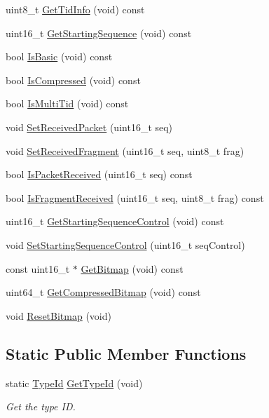 \begin{DoxyCompactItemize}
\item 
uint8\+\_\+t \hyperlink{classns3_1_1CtrlBAckResponseHeader_a43f367a0133f6741cf6649043cd70acb}{Get\+Tid\+Info} (void) const 
\item 
uint16\+\_\+t \hyperlink{classns3_1_1CtrlBAckResponseHeader_a23036dba9b580cbf431c3f3c472a3c2e}{Get\+Starting\+Sequence} (void) const 
\item 
bool \hyperlink{classns3_1_1CtrlBAckResponseHeader_aece37074c13f1dc4975cb2fbd5aa7d71}{Is\+Basic} (void) const 
\item 
bool \hyperlink{classns3_1_1CtrlBAckResponseHeader_a99150c95476eff0f8c51bee471f57c81}{Is\+Compressed} (void) const 
\item 
bool \hyperlink{classns3_1_1CtrlBAckResponseHeader_ad49134f2d4a9049c650951feed43d2e6}{Is\+Multi\+Tid} (void) const 
\item 
void \hyperlink{classns3_1_1CtrlBAckResponseHeader_af4aa188d4fe6bb69fe1e9ca24733e5a5}{Set\+Received\+Packet} (uint16\+\_\+t seq)
\item 
void \hyperlink{classns3_1_1CtrlBAckResponseHeader_abe81d476283659885ff98a3f44d184e6}{Set\+Received\+Fragment} (uint16\+\_\+t seq, uint8\+\_\+t frag)
\item 
bool \hyperlink{classns3_1_1CtrlBAckResponseHeader_ae42de686eccef343a48a7541a4afe148}{Is\+Packet\+Received} (uint16\+\_\+t seq) const 
\item 
bool \hyperlink{classns3_1_1CtrlBAckResponseHeader_a70b0907c76c2dd7db48a539ed657753d}{Is\+Fragment\+Received} (uint16\+\_\+t seq, uint8\+\_\+t frag) const 
\item 
uint16\+\_\+t \hyperlink{classns3_1_1CtrlBAckResponseHeader_a61d0ad6be50188f337d24d7a7ce274be}{Get\+Starting\+Sequence\+Control} (void) const 
\item 
void \hyperlink{classns3_1_1CtrlBAckResponseHeader_aca485dea9d949901088badc6e4f78333}{Set\+Starting\+Sequence\+Control} (uint16\+\_\+t seq\+Control)
\item 
const uint16\+\_\+t $\ast$ \hyperlink{classns3_1_1CtrlBAckResponseHeader_ad610b99d0710e273332378f56f036876}{Get\+Bitmap} (void) const 
\item 
uint64\+\_\+t \hyperlink{classns3_1_1CtrlBAckResponseHeader_ab8b75b44d071b9df44375a4bc8a7f605}{Get\+Compressed\+Bitmap} (void) const 
\item 
void \hyperlink{classns3_1_1CtrlBAckResponseHeader_a1a6e3c7e058332376d738f70bc0cb855}{Reset\+Bitmap} (void)
\end{DoxyCompactItemize}
\subsection*{Static Public Member Functions}
\begin{DoxyCompactItemize}
\item 
static \hyperlink{classns3_1_1TypeId}{Type\+Id} \hyperlink{classns3_1_1CtrlBAckResponseHeader_a4454e499a350e9a78349b694be189f9f}{Get\+Type\+Id} (void)
\begin{DoxyCompactList}\small\item\em Get the type ID. \end{DoxyCompactList}\end{DoxyCompactItemize}
